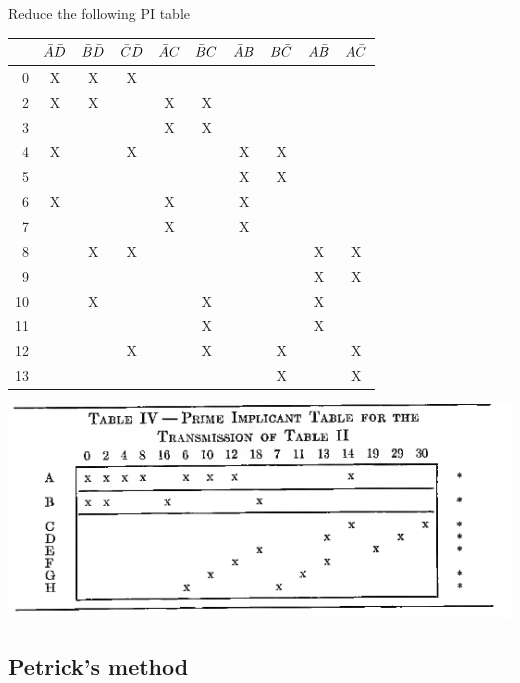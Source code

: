 \begin{example}
  Reduce the following PI table\\
  \begin{tabular}{r|ccccccccc}
    \toprule
    & $\bar{A}\bar{D}$ & $\bar{B}\bar{D}$ & $\bar{C}\bar{D}$ & $\bar{A} C$ & $\bar{B} C$ & $\bar{A} B$ & $B \bar{C}$& $A\bar{B}$ & $A \bar{C}$ \\
    \midrule
     0 & X & X & X &   &   &   &   &   &   \\
     2 & X & X &   & X & X &   &   &   &   \\
     3 &   &   &   & X & X &   &   &   &   \\
     4 & X &   & X &   &   & X & X &   &   \\
     5 &   &   &   &   &   & X & X &   &   \\
     6 & X &   &   & X &   & X &   &   &   \\
     7 &   &   &   & X &   & X &   &   &   \\
     8 &   & X & X &   &   &   &   & X & X \\
     9 &   &   &   &   &   &   &   & X & X \\
    10 &   & X &   &   & X &   &   & X &   \\
    11 &   &   &   &   & X &   &   & X &   \\
    12 &   &   & X &   & X &   & X &   & X \\
    13 &   &   &   &   &   &   & X &   & X \\
    \bottomrule
  \end{tabular}
\end{example}
\vspace{20em}
\begin{example}
  \includegraphics[width=\linewidth]{1956-mccluskey-table-4.png}
\end{example}

\subsection{Petrick's method}

